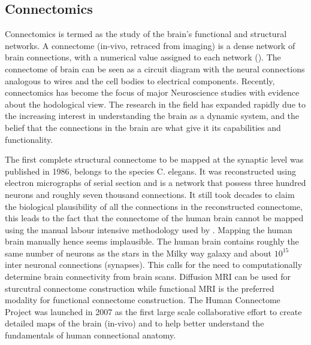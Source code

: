 \documentclass[msthesis.tex]{subfiles}
\begin{document}
\subsection{Connectomics}
\label{sec:connectomics}
Connectomics is termed as the study of the brain's functional and structural networks. A connectome (in-vivo, retraced from imaging) is a dense network of brain connections, with a numerical value assigned to each network (\cite{bassett2017network}). The connectome of brain can be seen as a circuit diagram with the neural connections analogous to wires and the cell bodies to electrical components.
Recently, connectomics has become the focus of major Neuroscience studies with evidence about the hodological view. The research in the field has expanded rapidly due to the increasing interest in understanding the brain as a dynamic system, and the belief that the connections in the brain are what give it its capabilities and functionality. \cite{network_neuroscience_editorial}

The first complete structural connectome to be mapped at the synaptic level was published in 1986,  belongs to the species C. elegans. It was reconstructed using electron micrographs of serial section and is a network that possess three hundred neurons and roughly seven thousand connections. It still took decades to claim the biological plausibility of all the connections in the reconstructed connectome\cite{elegans}, this leads to the fact that the connectome of the human brain cannot be mapped using the manual labour intensive methodology used by \cite{white1986structure}. Mapping the human brain manually hence seems implausible. The human brain contains roughly the same number of neurons as the stars in the Milky way galaxy and about $10^{15}$ inter neuronal connections (synapses)\cite{fornito2015connectomics}. This calls for the need to computationally determine brain connectivity from brain scans. Diffusion MRI can be used for sturcutral connectome construction while functional MRI is the preferred modality for functional connectome construction. The Human Connectome Project was launched in 2007 as the first large scale collaborative effort to create detailed maps of the brain (in-vivo) and to help better understand the fundamentals of human connectional anatomy.
\end{document}
